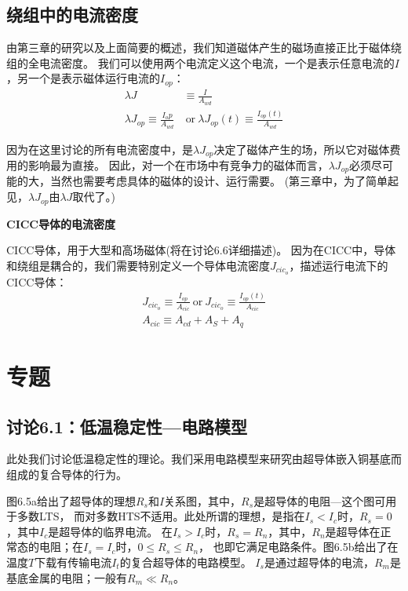 \subsection{绕组中的电流密度}
由第三章的研究以及上面简要的概述，我们知道磁体产生的磁场直接正比于磁体绕组的全电流密度。
我们可以使用两个电流定义这个电流，一个是表示任意电流的$I$，另一个是表示磁体运行电流的$I_{op}$：
\begin{subequations}
	\begin{align}
	\lambda J&\equiv\frac{I}{A_{wd}}\\
	\lambda J_{op}\equiv\frac{I_op}{A_{wd}}&  \ \mbox{or}\  \lambda J_{op}(t)\equiv\frac{I_{op}(t)}{A_{wd}}
	\end{align}
\end{subequations}

因为在这里讨论的所有电流密度中，是$\lambda J_{op}$决定了磁体产生的场，所以它对磁体费用的影响最为直接。
因此，对一个在市场中有竞争力的磁体而言，$\lambda J_{op}$必须尽可能的大，当然也需要考虑具体的磁体的设计、运行需要。
(第三章中，为了简单起见，$\lambda J_{op}$由$\lambda J$取代了。)

\textbf{CICC导体的电流密度}

CICC导体，用于大型和高场磁体(将在讨论6.6详细描述)。
因为在CICC中，导体和绕组是耦合的，我们需要特别定义一个导体电流密度$J_{cic_o}$，描述运行电流下的CICC导体：
\begin{subequations}
	\begin{align}
	J_{cic_o}\equiv\frac{I_{op}}{A_{cic}}\ \mbox{or}\ J_{cic_o}\equiv\frac{I_{op}(t)}{A_{cic}}\\
	A_{cic}\equiv A_{cd}+A_S+A_q
	\end{align}
\end{subequations}


\section{专题}
\subsection{讨论6.1：低温稳定性---电路模型}
此处我们讨论低温稳定性的理论。我们采用电路模型来研究由超导体嵌入铜基底而组成的复合导体的行为。

图6.5a给出了超导体的理想$R_s$和$I$关系图，其中，$R_s$是超导体的电阻---这个图可用于多数LTS，
而对多数HTS不适用。此处所谓的理想，是指在$I_s<I_c$时，$R_s=0$，其中$I_c$是超导体的临界电流。
在$I_s>I_c$时，$R_s=R_n$，其中，$R_n$是超导体在正常态的电阻；在$I_s=I_c$时，$0\le R_s\le 	R_n$，
也即它满足电路条件。图6.5b给出了在温度$T$下载有传输电流$I_t$的复合超导体的电路模型。
$I_s$是通过超导体的电流，$R_m$是基底金属的电阻；一般有$R_m\ll R_n$。

